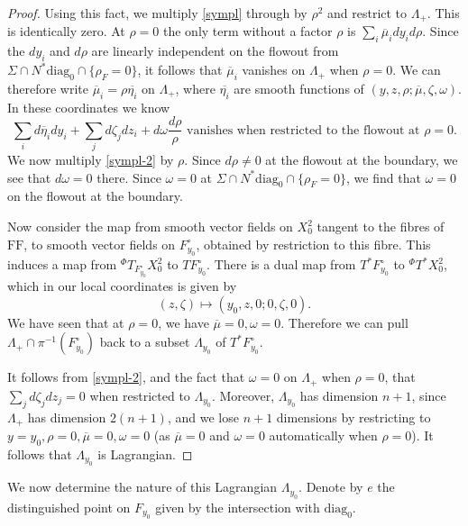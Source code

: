 \documentclass[10pt, a4paper, twoside]{amsart}
\numberwithin{equation}{section}
\theoremstyle{remark}
\begin{document}
\begin{proof}
Using this fact, we multiply \eqref{sympl} through by $\rho^2$ and restrict to $\Lambda_+$. This is identically zero. At $\rho = 0$ the only term without a factor $\rho$ is $\sum_i \overline{\mu}_i dy_i d\rho$. Since the $dy_i$ and $d\rho$ are linearly independent on the flowout from $\Sigma \cap N^* {\mathrm{diag}_0} \cap \{ \rho_F = 0 \}$, it follows that $\overline{\mu}_i$ vanishes on $\Lambda_+$ when $\rho = 0$.
We can therefore write $\overline{\mu}_i = \rho \overline{\eta_i}$ on $\Lambda_+$, where $\overline{\eta_i}$ are smooth functions of
$(y, z, \rho; \overline{\mu}, \zeta, \omega)$. In these coordinates we know
\begin{equation}
\sum_i  d\overline{\eta}_i dy_i + \sum_j d\zeta_j  dz_i + d\omega \frac{d\rho}{\rho} \text{ vanishes when restricted to the flowout at } \rho = 0 .
\label{sympl-2}\end{equation}
We now multiply \eqref{sympl-2} by $\rho$. Since $d\rho \neq 0$ at the flowout at the boundary, we see that $d\omega = 0$ there. Since $\omega=0$ at $\Sigma \cap N^* {\mathrm{diag}_0} \cap \{ \rho_F = 0 \}$, we find that $\omega = 0$ on the flowout at the boundary.

Now consider the map from smooth vector fields on $X^2_0$ tangent to the fibres of ${\mathrm{FF}}$, to smooth vector fields on  $F_{y_0}^\circ$, obtained by restriction to this fibre. This induces a map from ${}^\Phi T_{F_{y_0}^\circ}X^2_0$ to $T F_{y_0}^\circ$.
There is a dual map from $T^* F_{y_0}^\circ$ to ${}^\Phi T^* X^2_0$, which in our local coordinates is given by
$$
(z, \zeta) \mapsto (y_0, z, 0; 0, \zeta, 0).
$$
We have seen that at $\rho = 0$, we have $\overline{\mu} = 0, \omega = 0$. Therefore we can pull $\Lambda_+ \cap \pi^{-1} (F_{y_0}^\circ)$ back to a subset $\Lambda_{y_0}$ of $T^* F_{y_0}^\circ$.

It follows from \eqref{sympl-2}, and the fact that $\omega = 0$ on $\Lambda_+$ when $\rho = 0$,  that $\sum_j d\zeta_j dz_j = 0$ when restricted to $\Lambda_{y_0}$.  Moreover, $\Lambda_{y_0}$  has dimension $n+1$, since $\Lambda_+$ has dimension $2(n+1)$, and we lose $n+1$ dimensions by restricting to $y = y_0, \rho = 0, \overline{\mu} = 0, \omega = 0$ (as $\overline{\mu} = 0$ and $\omega = 0$ automatically when $\rho = 0$). It follows that $\Lambda_{y_0}$ is Lagrangian.
\end{proof}

 
We now determine the nature of this Lagrangian $\Lambda_{y_0}$. Denote by $e$ the distinguished point on $F_{y_0}$ given by the intersection with ${\mathrm{diag}_0}$. 
\end{document}
